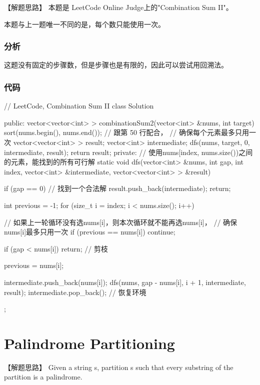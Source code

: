 【解题思路】
本题是 LeetCode Online Judge上的"Combination Sum II"。

本题与上一题唯一不同的是，每个数只能使用一次。

\subsubsection{分析}
这题没有固定的步骤数，但是步骤也是有限的，因此可以尝试用回溯法。

\subsubsection{代码}
\begin{Codex}[label=combination_sum2.cpp]
// LeetCode, Combination Sum II
class Solution {
public:
    vector<vector<int> > combinationSum2(vector<int> &nums, int target) {
        sort(nums.begin(), nums.end()); // 跟第 50 行配合，
                                             // 确保每个元素最多只用一次
        vector<vector<int> > result;
        vector<int> intermediate;
        dfs(nums, target, 0, intermediate, result);
        return result;
    }
private:
    // 使用nums[index, nums.size())之间的元素，能找到的所有可行解
    static void dfs(vector<int> &nums, int gap, int index,
            vector<int> &intermediate, vector<vector<int> > &result) {
        if (gap == 0) {  //  找到一个合法解
            result.push_back(intermediate);
            return;
        }

        int previous = -1;
        for (size_t i = index; i < nums.size(); i++) {
            // 如果上一轮循环没有选nums[i]，则本次循环就不能再选nums[i]，
            // 确保nums[i]最多只用一次
            if (previous == nums[i]) continue;

            if (gap < nums[i]) return;  // 剪枝

            previous = nums[i];

            intermediate.push_back(nums[i]);
            dfs(nums, gap - nums[i], i + 1, intermediate, result);
            intermediate.pop_back();  // 恢复环境
        }
    }
};
\end{Codex}



\section{Palindrome Partitioning} %
\label{sec:palindrome-partitioning}


【解题思路】
Given a string s, partition s such that every substring of the partition is a palindrome.

